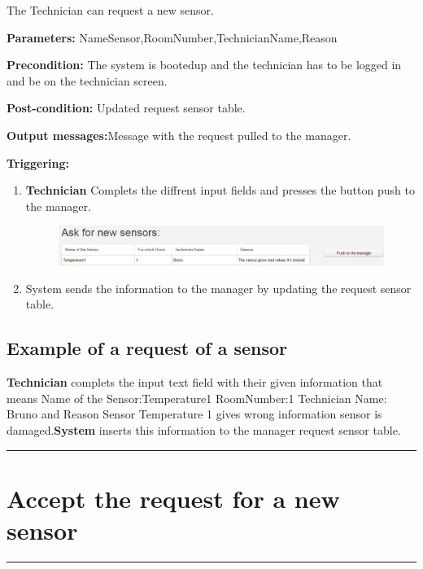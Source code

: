 The Technician can request a new sensor.
\begin{description}
\item \textbf{Parameters:} NameSensor,RoomNumber,TechnicianName,Reason
\item \textbf{Precondition:} The system is bootedup and the technician has to be
logged in and be on the technician screen.
\item \textbf{Post-condition:} Updated request sensor table.
\item \textbf{Output messages:}Message with the request pulled to the manager.
\item \textbf{Triggering:}
\begin{enumerate}
\item \textbf{Technician} Complets the diffrent input fields and presses the
button push to the manager.
\begin{figure}[H]
\includegraphics[width=1\textwidth]{images/AskForANewSensor.eps}
\end{figure}
\item System sends the information to the manager by updating the request
sensor table.
\end{enumerate}
\end{description}

\subsection{Example of a request of a sensor}
\textbf{Technician} complets the input text field with their given information
that means Name of the Sensor:Temperature1 RoomNumber:1 Technician Name: Bruno
and Reason Sensor Temperature 1 gives wrong information sensor is
damaged.\textbf{System} inserts this information to the manager request sensor
table.
\hfill
\vspace{0.5cm}
\hrule

\section{Accept the request for a new sensor}

\hrule
\hfill
\vspace{0.5cm}

\label{operation:Accept the request for a new sensor}

